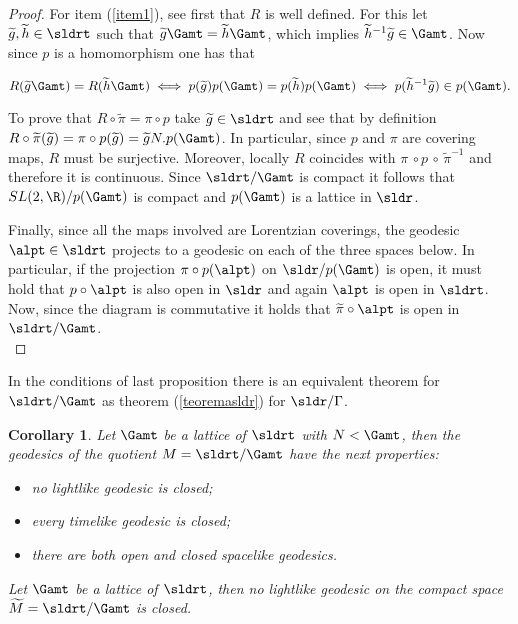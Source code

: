 \documentclass[11pt]{amsart}
\theoremstyle{plain}
\newtheorem{cor}[thm]{Corollary}
\theoremstyle{definition}
\theoremstyle{remark}
\begin{document}
\begin{proof}
	For item (\ref{item1}), see first that $R$ is well defined. For this let $\widetilde{g},\widetilde{h} \in \sldrt$ such that $\widetilde{g} \Gamt = \widetilde{h} \Gamt$, which implies  $\widetilde{h}^{-1}\widetilde{g} \in \Gamt$. Now since $p$ is a homomorphism one has that
	
	\begin{equation*}
	R(\widetilde{g} \Gamt) = R(\widetilde{h} \Gamt) \iff p(\widetilde{g}) p(\Gamt) = p(\widetilde{h}) p(\Gamt) \iff p(\widetilde{h}^{-1} \widetilde{g}) \in p(\Gamt).
	\end{equation*}
	
	To prove that $R \circ \widetilde{\pi} = \pi \circ p$ take $\widetilde{g} \in \sldrt$ and see that by definition $R \circ \widetilde{\pi}(\widetilde{g}) = \pi \circ p(\widetilde{g}) = \widetilde{g}N.p(\Gamt)$. In particular, since $p$ and $\pi$ are covering maps, $R$ must be surjective. Moreover,  locally  $R$ coincides with  $\pi \, \circ  p \, \circ \, \widetilde{\pi}^{-1}$  and therefore it is continuous. Since $\sldrt/\Gamt$ is compact it follows that  $SL(2,\R) / p(\Gamt)$ is compact and $p(\Gamt)$ is a lattice in $\sldr$. 
	
	Finally, since all the maps involved are Lorentzian coverings, the geodesic $\alpt\in \sldrt$ projects to a geodesic on each of the three spaces below. In particular, if the projection  $\pi \circ p(\alpt)$ on $\sldr/p(\Gamt)$ is open, it must hold that  $p \circ \alpt$ is also open in $\sldr$ and again $\alpt$ is open in $\sldrt$. Now, since the diagram is commutative it holds  that $\widetilde{\pi} \circ \alpt$ is open in $\sldrt/\Gamt$.\\
\end{proof}

In the conditions of last proposition there is an equivalent theorem for $\sldrt/\Gamt$ as theorem (\ref{teoremasldr}) for $\sldr / \Gamma$.

\begin{cor}\label{teoremasldrt}
Let $\Gamt$ be a lattice of  $\sldrt$ with $N < \Gamt$, then the geodesics of the quotient $M = \sldrt / \Gamt$ have the next properties:
    \begin{itemize}
	    \item  no lightlike geodesic  is closed;
	    \item every timelike geodesic is closed;
	    \item there are both open and closed spacelike geodesics.
    \end{itemize}


	Let $\Gamt$ be a lattice of  $\sldrt$, then no lightlike geodesic on the compact space $\widetilde{M}=\sldrt/\Gamt$ is closed.
\end{cor}
\end{document}
